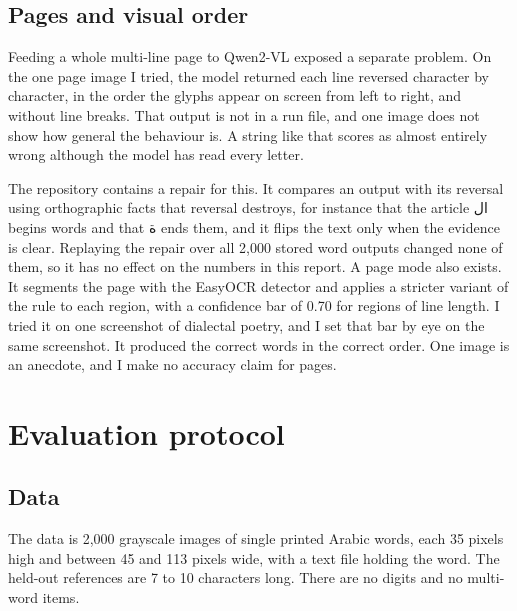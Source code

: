 \documentclass[11pt,a4paper]{article}
\newcommand{\ar}[1]{{\beginR\arabicfont #1\endR}}
\begin{document}
\subsection{Pages and visual order}

Feeding a whole multi-line page to Qwen2-VL exposed a separate problem. On
the one page image I tried, the model returned each line reversed character
by character, in the order the glyphs appear on screen from left to right, and
without line breaks. That output is not in a run file, and one image does not
show how general the behaviour is. A string like that scores as almost
entirely wrong although the model has read every letter.

The repository contains a repair for this. It compares an output with its
reversal using orthographic facts that reversal destroys, for instance that
the article \ar{ال} begins words and that \ar{ة} ends them, and it flips the
text only when the evidence is clear. Replaying the repair over all 2,000
stored word outputs changed none of them, so it has no effect on the numbers
in this report. A page mode also exists. It segments the page with the EasyOCR
detector and applies a stricter variant of the rule to each region, with a
confidence bar of 0.70 for regions of line length. I tried it on one
screenshot of dialectal poetry, and I set that bar by eye on the same
screenshot. It produced the correct words in the correct order. One image is
an anecdote, and I make no accuracy claim for pages.

\section{Evaluation protocol}

\subsection{Data}
\label{sec:data}

The data is 2,000 grayscale images of single printed Arabic words, each 35
pixels high and between 45 and 113 pixels wide, with a text file holding the
word. The held-out references are 7 to 10 characters long. There are no
digits and no multi-word items.
\end{document}
